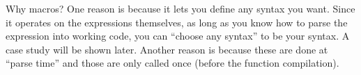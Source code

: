 \documentclass[11pt]{article}
\begin{document}
Why macros? One reason is because it lets you define any syntax you
want. Since it operates on the expressions themselves, as long as you
know how to parse the expression into working code, you can ``choose any
syntax'' to be your syntax. A case study will be shown later. Another
reason is because these are done at ``parse time'' and those are only
called once (before the function compilation).


    
    
    
    
\end{document}
